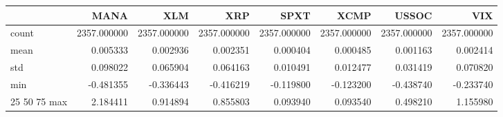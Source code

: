 \begin{tabular}{lrrrrrrr}
\toprule
 & MANA & XLM & XRP & SPXT & XCMP & USSOC & VIX \\
\midrule
count & 2357.000000 & 2357.000000 & 2357.000000 & 2357.000000 & 2357.000000 & 2357.000000 & 2357.000000 \\
mean & 0.005333 & 0.002936 & 0.002351 & 0.000404 & 0.000485 & 0.001163 & 0.002414 \\
std & 0.098022 & 0.065904 & 0.064163 & 0.010491 & 0.012477 & 0.031419 & 0.070820 \\
min & -0.481355 & -0.336443 & -0.416219 & -0.119800 & -0.123200 & -0.438740 & -0.233740 \\
25%
50%
75%
max & 2.184411 & 0.914894 & 0.855803 & 0.093940 & 0.093540 & 0.498210 & 1.155980 \\
\bottomrule
\end{tabular}
